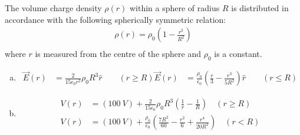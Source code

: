\question The volume charge density $\rho(r)$ within a sphere of radius $R$ is distributed in accordance with the following spherically symmetric relation:
\begin{align*}
\rho(r)=\rho_0\left(1-\frac{r^{2}}{R^{2}}\right)\\
\end{align*}
where $r$ is measured from the centre of the sphere and $\rho_0$ is a constant.
\begin{finalanswer}
\begin{enumerate}[(a)]
\item \begin{align*}
\vec E(r)&=\frac{2}{15\epsilon_0r^2}\rho_0R^3\hat r \qquad (r\geq R)
\vec E(r)&=\frac{\rho_0}{\epsilon_0}\left( \frac{r}{3}-\frac{r^3}{5R^2}\right) \hat r \qquad (r\leq R)
\end{align*}
\item \begin{align*}
V(r) &=(\SI{100}{V})+\frac{2}{15 \epsilon_0}\rho_0R^3\left( \frac{1}{r}-\frac{1}{R}\right)\quad(r\geq R)\\
V(r) &=(\SI{100}{V})+\frac{\rho_0}{\epsilon_0}\left(\frac{7R^2}{60} -\frac{r^2}{6}+\frac{r^{4}}{20R^{2}}    \right)\quad(r< R)
\end{align*}
\end{enumerate}
\end{finalanswer}
